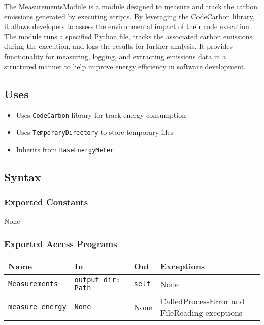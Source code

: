 \documentclass[12pt, titlepage]{article}
\begin{document}
The MeasurementsModule is a module designed to measure and track the carbon emissions generated by executing scripts. By leveraging the CodeCarbon library, it allows developers to assess the environmental impact of their code execution. The module runs a specified Python file, tracks the associated carbon emissions during the execution, and logs the results for further analysis. It provides functionality for measuring, logging, and extracting emissions data in a structured manner to help improve energy efficiency in software development.


\subsection{Uses}

\begin{itemize}
\item Uses \texttt{CodeCarbon} library for track energy consumption
\item Uses \texttt{TemporaryDirectory} to store temporary files
\item Inherits from \texttt{BaseEnergyMeter}
\end{itemize}

\subsection{Syntax}

\subsubsection{Exported Constants}
None

\subsubsection{Exported Access Programs}

\begin{center}
\begin{tabularx}{\linewidth}{|l|>{\raggedright\arraybackslash}X|l|l|}
\hline
\textbf{Name} & \textbf{In} & \textbf{Out} & \textbf{Exceptions} \\
\hline
\texttt{Measurements} & \texttt{output\_dir: Path} & \texttt{self} & None \\
\hline
\texttt{measure\_energy} & \texttt{None} & None & CalledProcessError and FileReading exceptions \\
\hline
\end{tabularx}
\end{center}
\end{document}

